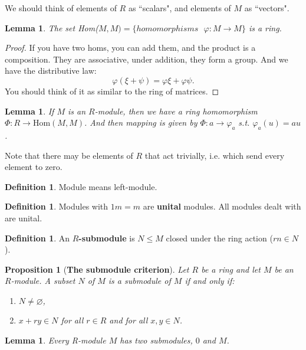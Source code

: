 \documentclass[9pt,reqno,twoside]{amsbook}
\let\emptyset\varnothing
\theoremstyle{plain}
\numberwithin{section}{chapter}
\numberwithin{equation}{chapter}
\newtheorem{lem}[theorem]{Lemma}
\newtheorem{Prop}[theorem]{Proposition}
\theoremstyle{definition}
\newtheorem{Def}[theorem]{Definition}
\theoremstyle{remark}
\theoremstyle{plain}
\renewcommand{\leq}{\leqslant}
\renewcommand{\phi}{\varphi}
\begin{document}
We should think of elements of $R$ as ``scalars", and elements of $M$ as ``vectors".

\begin{lem}
The set Hom($M,M) = \{homomorphisms \text{ } \phi:M \to M\}$ is a ring. 
\end{lem} 

\begin{proof}
If you have two homs, you can add them, and the product is a composition. They are associative, under addition, they form a group. And we have the distributive law: 
$$
\phi(\xi + \psi) = \phi\xi + \phi\psi.
$$
You should think of it as similar to the ring of matrices. 
\end{proof}


\begin{lem}
If $M$ is an $R$-module, then we have a ring homomorphism $\Phi: R \to \text{Hom}(M,M)$. And then mapping is given by $\Phi: a \to \phi_a$ s.t. $\phi_a(u) = au$. 
\end{lem} 

Note that there may be elements of $R$ that act trivially, i.e. which send every element to zero. 

\begin{Def}
Module means left-module. 
\end{Def}

\begin{Def}
Modules with $1m = m$ are \textbf{unital} modules. All modules dealt with are unital. 
\end{Def}

\begin{Def}
An \textbf{$R$-submodule} is $N \leq M$ closed under the ring action ($rn \in N$). 
\end{Def}

\begin{Prop}[\textbf{The submodule criterion}]
Let $R$ be a ring and let $M$ be an $R$-module. A subset $N$ of $M$ is a submodule of $M$ if and only if:
\begin{enumerate}
\item $N \neq \emptyset $,
\item $x + ry \in N$ for all $r \in R$ and for all $x,y\in N$. 
\end{enumerate}
\end{Prop}

\begin{lem}
Every R-module $M$ has two submodules, $0$ and $M$. 
\end{lem}
\end{document}
